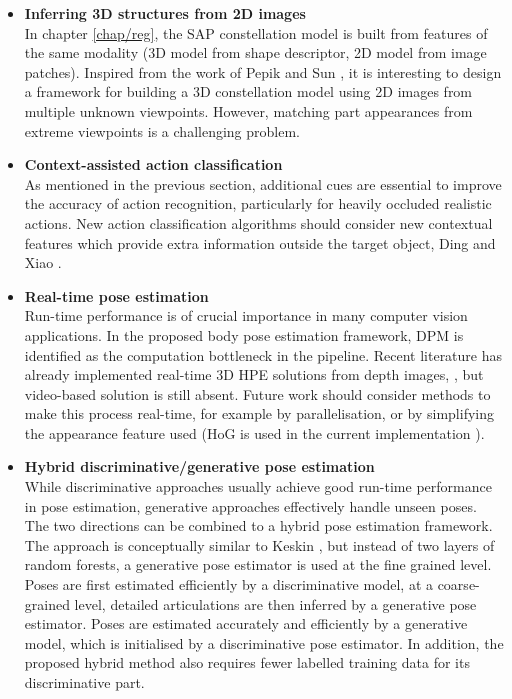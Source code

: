 \begin{itemize}
	\item \textbf{Inferring 3D structures from 2D images} \\  
	In chapter \ref{chap/reg}, the SAP constellation model is built from features of the same modality (3D model from shape descriptor, 2D model from image patches). Inspired from the work of Pepik \etal \cite{Pepik2012} and Sun \etal \cite{Sun2009}, it is interesting to design a framework for building a 3D constellation model using 2D images from multiple unknown viewpoints. However, matching part appearances from extreme viewpoints is a challenging problem.  
	\item \textbf{Context-assisted action classification} \\ 
	As mentioned in the previous section, additional cues are essential to improve the accuracy of action recognition, particularly for heavily occluded realistic actions. New action classification algorithms should consider new contextual features which provide extra information outside the target object, \eg Ding and Xiao \cite{Ding2012}.   
	\item \textbf{Real-time pose estimation}\\ 
	Run-time performance is of crucial importance in many computer vision applications. In the proposed body pose estimation framework, DPM is identified as the computation bottleneck in the pipeline. 
	Recent literature has already implemented real-time 3D HPE solutions from depth images, \eg \cite{Baak2011, Girshick2011, Sun2012}, but video-based solution is still absent.  
	Future work should consider methods to make this process real-time, for example by parallelisation, or by simplifying the appearance feature used (HoG is used in the current implementation \cite{Yang2011}).  
	\item \textbf{Hybrid discriminative/generative pose estimation}\\
	While discriminative approaches usually achieve good run-time performance in pose estimation, generative approaches effectively handle unseen poses. The two directions can be combined to a hybrid pose estimation framework. The approach is conceptually similar to Keskin \etal \cite{Keskin2012}, but instead of two layers of random forests, a generative pose estimator is used at the fine grained level. Poses are first estimated efficiently by a discriminative model, at a coarse-grained level, detailed articulations are then inferred by a generative pose estimator. Poses are estimated accurately and efficiently by a generative model, which is initialised by a discriminative pose estimator. In addition, the proposed hybrid method also requires fewer labelled training data for its discriminative part. 

\end{itemize}

